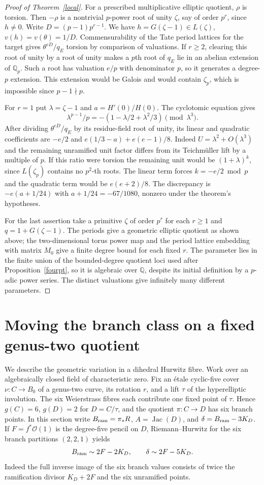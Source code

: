 \documentclass[11pt]{article}
\newcommand{\Jac}{\operatorname{Jac}}
\newcommand{\Q}{\mathbb Q}
\begin{document}
\begin{proof}[Proof of Theorem~\ref{local}]
For a prescribed multiplicative elliptic quotient, $\rho$ is torsion.
Then $-\rho$ is a nontrivial $p$-power root of unity $\zeta$, say of
order $p^r$, since $h\ne0$. Write $D=(p-1)p^{r-1}$. We have
$h=G(\zeta-1)\in L(\zeta)$, $v(h)=v(\theta)=1/D$.
Commensurability of the Tate period lattices for the target gives
$\theta^{eD}/q_E$ torsion by comparison of valuations.
If $r\ge2$, clearing this root of unity by a root of unity makes a
$p$th root of $q_E$ lie in an abelian extension of $\Q_p$.
Such a root has valuation $e/p$ with denominator $p$,
so it generates a degree-$p$ extension. This extension would be Galois
and would contain $\zeta_p$, which is impossible since $p-1\nmid p$.

For $r=1$ put $\lambda=\zeta-1$ and $a=H'(0)/H(0)$. The cyclotomic
equation gives
\[
 \lambda^{p-1}/p=-(1-\lambda/2+\lambda^2/3)
                  \pmod{\lambda^3}.
\]
After dividing $\theta^{eD}/q_E$ by its residue-field root of unity,
its linear and quadratic coefficients are
$-e/2$ and $e(1/3-a)+e(e-1)/8$. Indeed
$U=\lambda^2+O(\lambda^3)$ and the remaining unramified unit factor
differs from its Teichm\"uller lift by a multiple of $p$.
If this ratio were torsion the remaining unit would be
$(1+\lambda)^k$, since $L(\zeta_p)$ contains no $p^2$-th roots.
The linear term forces $k=-e/2\bmod p$ and the quadratic term would
be $e(e+2)/8$. The discrepancy is $-e(a+1/24)$ with
$a+1/24=-67/1080$, nonzero under the theorem's hypotheses.

For the last assertion take a primitive $\zeta$ of order $p^r$ for
each $r\ge1$ and $q=1+G(\zeta-1)$. The periods give a geometric
elliptic quotient as shown above; the two-dimensional torus power
map and the period lattice embedding with matrix $M_0$ give a finite
degree bound for each fixed $r$. The parameter lies in the finite
union of the bounded-degree quotient loci used after
Proposition~\ref{fourpt}, so it is algebraic over $\Q$, despite its
initial definition by a $p$-adic power series. The distinct valuations
give infinitely many different parameters.
\end{proof}

\section{Moving the branch class on a fixed genus-two quotient}
We describe the geometric variation in a dihedral Hurwitz fibre. Work
over an algebraically closed field of characteristic zero. Fix an
\'etale cyclic-five cover $\nu:C\to B_0$ of a genus-two curve, its
rotation $r$, and a lift $\tau$ of the hyperelliptic involution. The six
Weierstrass fibres each contribute one fixed point of $\tau$. Hence
$g(C)=6$, $g(D)=2$ for $D=C/\tau$, and the quotient $\pi:C\to D$ has
six branch points. In this section write $B_{\rm ram}=\pi_*R$,
$A=\Jac(D)$, and $\delta=B_{\rm ram}-3K_D$.
If $F=f^*\mathcal O(1)$ is the degree-five pencil on $D$,
Riemann--Hurwitz for the six branch partitions $(2,2,1)$ yields
\[
 B_{\rm ram}\sim2F-2K_D,\qquad \delta\sim2F-5K_D.
\]
Indeed the full inverse image of the six branch values consists of
twice the ramification divisor $K_D+2F$ and the six unramified points.
\end{document}
